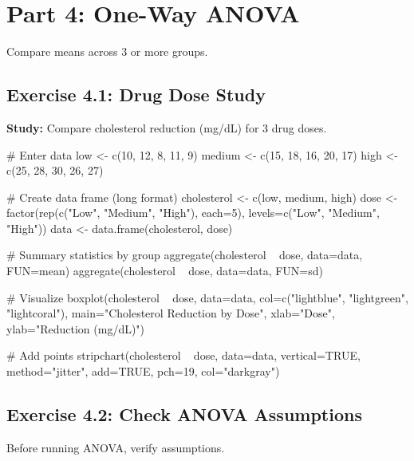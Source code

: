 \documentclass[11pt]{article}
\begin{document}
\vspace{1cm}

\section{Part 4: One-Way ANOVA}

Compare means across 3 or more groups.

\subsection{Exercise 4.1: Drug Dose Study}

\textbf{Study:} Compare cholesterol reduction (mg/dL) for 3 drug doses.

\begin{rcode}
# Enter data
low <- c(10, 12, 8, 11, 9)
medium <- c(15, 18, 16, 20, 17)
high <- c(25, 28, 30, 26, 27)

# Create data frame (long format)
cholesterol <- c(low, medium, high)
dose <- factor(rep(c("Low", "Medium", "High"), each=5),
               levels=c("Low", "Medium", "High"))
data <- data.frame(cholesterol, dose)

# Summary statistics by group
aggregate(cholesterol ~ dose, data=data, FUN=mean)
aggregate(cholesterol ~ dose, data=data, FUN=sd)

# Visualize
boxplot(cholesterol ~ dose, data=data,
        col=c("lightblue", "lightgreen", "lightcoral"),
        main="Cholesterol Reduction by Dose",
        xlab="Dose", ylab="Reduction (mg/dL)")

# Add points
stripchart(cholesterol ~ dose, data=data,
           vertical=TRUE, method="jitter", add=TRUE,
           pch=19, col="darkgray")
\end{rcode}

\newpage

\subsection{Exercise 4.2: Check ANOVA Assumptions}

Before running ANOVA, verify assumptions.
\end{document}

